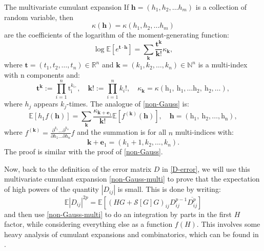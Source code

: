 \documentclass[11pt, a4paper, oneside]{book}
\numberwithin{equation}{chapter}
\newcommand{\E}{\mathbb E}
\newcommand{\beq}{\begin{equation}}
\newcommand{\eeq}{\end{equation}}
\begin{document}
\begin{section}{The multivariate cumulant expansion}
If $\mathbf{h}=\left(h_1, h_2, \ldots h_m\right)$ is a collection of random variable, then
$$
\kappa(\mathbf{h})=\kappa\left(h_1, h_2, \ldots h_m\right)
$$
are the coefficients of the logarithm of the moment-generating function:
\beq \label{log-moments-multi}
\log \mathbb{E} [e^{\mathbf{t} \cdot \mathbf{h}}] =\sum_{\mathbf{k}} \frac{\mathbf{t}^{\mathbf{k}}}{\mathbf{k} !} \kappa_{\mathbf{k}},
\eeq
%
where $\mathbf{t}=\left(t_1, t_2, \ldots, t_n\right) \in \mathbb{R}^n$ and $\mathbf{k}=\left(k_1, k_2, \ldots, k_n\right) \in \mathbb{N}^n$ is a multi-index with $\mathrm{n}$ components and:
$$
\mathbf{t}^{\mathbf{k}}:=\prod_{i=1}^n \mathrm{t}_{\mathrm{i}}^{{k}_{{i}},}, \quad \mathbf{k} ! :=\prod_{i=1}^n {k}_{{i}} !, \quad \kappa_{\mathbf{k}}=\kappa \left(\mathrm{h}_1, \mathrm{~h}_1, \ldots \mathrm{h}_2, \mathrm{~h}_2, \ldots\right),
$$
where $h_j$ appears $k_j$-times. The analogue of \eqref{non-Gauss} is:
%
\beq \label{non-Gauss-multi}
\mathbb{E} [h_1 f(\mathbf{h})]=\sum_{\mathbf{k}} \frac{\kappa_{\mathbf{k}+\mathbf{e}_1}}{\mathbf{k} !} \mathbb{E} [f^{(\mathbf{k})}(\mathbf{h})], \quad \mathbf{h}=\left(\mathrm{h}_1, \mathrm{~h}_2, \ldots, \mathrm{h}_{\mathrm{n}}\right),
\eeq
%
where $f^{(\mathbf{k})} = \frac{\partial^{k_1}...\partial^{k_n}}{\partial{h_1}...\partial{h_n} } f$ and the summation is for all $n$ multi-indices with:
\[
\mathbf{k}+\mathbf{e}_1 = (k_1+1,k_2,...,k_n) .
\]
The proof is similar with the proof of \eqref{non-Gauss}.

Now, back to the definition of the error matrix $D$ in \eqref{D-error}, we will use this multivariate cumulant expansion \eqref{non-Gauss-multi} to prove that the expectation of high powers of the quantity $|D_{ij}|$ is small. This is done by writing:
%
\beq \label{D^p}
\E |D_{ij}|^{2p} = \E \left [ (HG + \mathcal{S}[G]G )_{ij} D_{ij}^{p-1} \overline{D_{ij}^p} \right ]
\eeq
%
and then use \eqref{non-Gauss-multi} to do an integration by parts in the first $H$ factor, while considering everything else as a function $f(H)$. This involves some heavy analysis of cumulant expansions and combinatorics, which can be found in \cite{erdHos2019random}.


\end{section}
\end{document}
